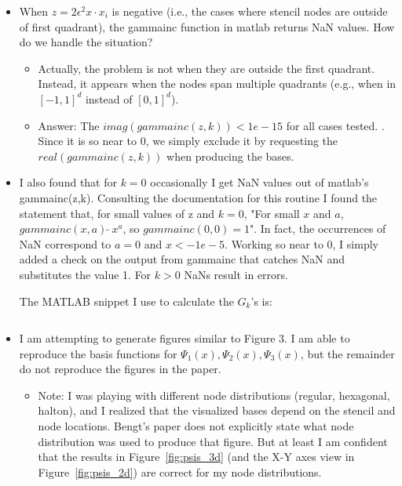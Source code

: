 \documentclass[11pt]{report}
\begin{document}
\begin{itemize}
\item When $z = 2\epsilon^2 x \cdot x_i$ is negative (i.e., the cases where stencil nodes are outside of first quadrant), the gammainc function in matlab returns NaN values. How do we handle the situation? 
\begin{itemize}
\item Actually, the problem is not when they are outside the first quadrant. Instead, it appears when the nodes span multiple quadrants (e.g., when in $[-1,1]^d$ instead of $[0,1]^d$).
\item Answer: The $imag(gammainc(z,k)) < 1e-15$ for all cases tested. . Since it is so near to 0, we simply exclude it by requesting the $real(gammainc(z,k))$ when producing the bases. 
\end{itemize}
\item I also found that for $k=0$ occasionally I get NaN values out of matlab's gammainc(z,k). Consulting the documentation for this routine I found the statement that, for small values of z and $k=0$, "For small $x$ and $a$, $gammainc(x,a) \  \tilde{} \ x^a$, so $gammainc(0,0) = 1$". In fact, the occurrences of NaN correspond to $a=0$ and $x < -1e-5$. Working so near to $0$, I simply added a check on the output from gammainc that catches NaN and substitutes the value 1. For $k>0$ NaNs result in errors.

The MATLAB snippet I use to calculate the $G_k$'s is: 

\begin{verbatim}

\end{verbatim}


\item I am attempting to generate figures similar to Figure 3. I am able to reproduce the basis functions for $\Psi_1(x), \Psi_2(x), \Psi_3(x)$, but the remainder do not reproduce the figures in the paper. 
\begin{itemize}
\item Note: I was playing with different node distributions (regular, hexagonal, halton), and I realized that the visualized bases depend on the stencil and node locations. Bengt's paper does not explicitly state what node distribution was used to produce that figure. But at least I am confident that the results in Figure~\ref{fig:psis_3d} (and the X-Y axes view in Figure~\ref{fig:psis_2d}) are correct for my node distributions.
\end{itemize}
\end{itemize}
\end{document}
